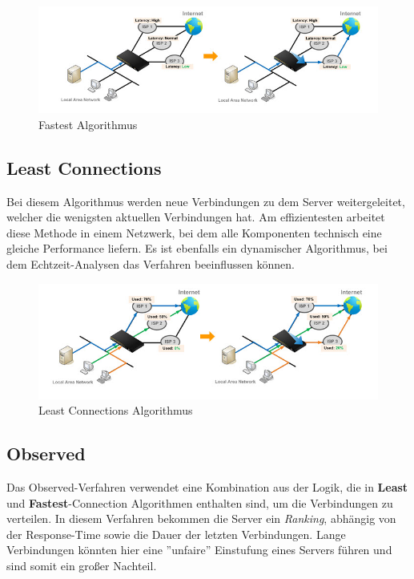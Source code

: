 \begin{figure}[!h]
	\begin{center}
		\includegraphics[width=0.8\linewidth]{images/lb_low}
		\caption{Fastest Algorithmus}
		\label{broker}
	\end{center}
\end{figure}

\newpage
\subsection{Least Connections}
\label{Least Connections}
Bei diesem Algorithmus werden neue Verbindungen zu dem Server weitergeleitet, welcher die wenigsten aktuellen Verbindungen hat. Am effizientesten arbeitet diese Methode in einem Netzwerk, bei dem alle Komponenten technisch eine gleiche Performance liefern. Es ist ebenfalls ein dynamischer Algorithmus, bei dem Echtzeit-Analysen das Verfahren beeinflussen können. 

\begin{figure}[!h]
	\begin{center}
		\includegraphics[width=0.8\linewidth]{images/lb_least}
		\caption{Least Connections Algorithmus}
		\label{broker}
	\end{center}
\end{figure}

\subsection{Observed}
\label{Observed}

Das Observed-Verfahren verwendet eine Kombination aus der Logik, die in \textbf{Least} und \textbf{Fastest}-Connection Algorithmen enthalten sind, um die Verbindungen zu verteilen. In diesem Verfahren bekommen die Server ein \textit{Ranking}, abhängig von der Response-Time sowie die Dauer der letzten Verbindungen. Lange Verbindungen könnten hier eine ''unfaire'' Einstufung eines Servers führen und sind somit ein großer Nachteil.


